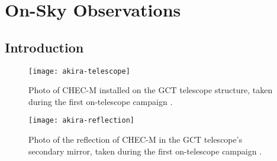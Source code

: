 \chapter{\label{ch8-onsky}On-Sky Observations} 

\minitoc


\section{Introduction}

\begin{figure}
  \centering
  \texttt{[image: akira-telescope]}
  \caption[Photo of CHEC-M installed on the GCT telescope structure.]{Photo of CHEC-M installed on the GCT telescope structure, taken during the first on-telescope campaign \cite{akira-telescope}.}
  \label{fig:akira-telescope}
\end{figure}

\begin{figure}
  \centering
  \texttt{[image: akira-reflection]}
  \caption[Photo of the reflection of CHEC-M in the secondary mirror.]{Photo of the reflection of CHEC-M in the GCT telescope's secondary mirror, taken during the first on-telescope campaign \cite{akira-reflection}.}
  \label{fig:akira-reflection}
\end{figure}


